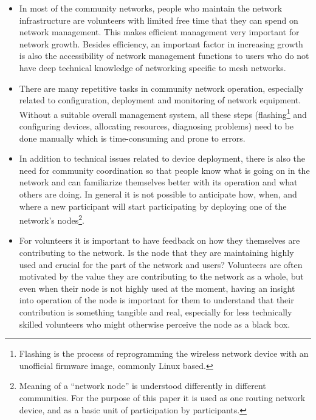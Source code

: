 \documentclass[5p,sort&compress]{elsarticle}
\begin{document}
\begin{itemize}
\item In most of the community networks, people who maintain the network infrastructure are volunteers with limited free time that they can spend on network management.
This makes efficient management very important for network growth.
Besides efficiency, an important factor in increasing growth is also the accessibility of network management functions to users who do not have deep technical knowledge of networking specific to mesh networks.

\item There are many repetitive tasks in community network operation, especially related to configuration, deployment and monitoring of network equipment.
Without a suitable overall management system, all these steps (flashing\footnote{Flashing is the process of reprogramming the wireless network device with an unofficial firmware image, commonly Linux based.} and configuring devices, allocating resources, diagnosing problems) need to be done manually which is time-consuming and prone to errors.

\item In addition to technical issues related to device deployment, there is also the need for community coordination so that people know what is going on in the network and can familiarize themselves better with its operation and what others are doing.
In general it is not possible to anticipate how, when, and where a new participant will start participating by deploying one of the network's nodes\footnote{Meaning of a ``network node'' is understood differently in different communities. For the purpose of this paper it is used as one routing network device, and as a basic unit of participation by participants.}.

\item For volunteers it is important to have feedback on how they themselves are contributing to the network.
Is the node that they are maintaining highly used and crucial for the part of the network and users?
Volunteers are often motivated by the value they are contributing to the network as a whole, but even when their node is not highly used at the moment, having an insight into operation of the node is important for them to understand that their contribution is something tangible and real, especially for less technically skilled volunteers who might otherwise perceive the node as a black box.
\end{itemize}
\end{document}
